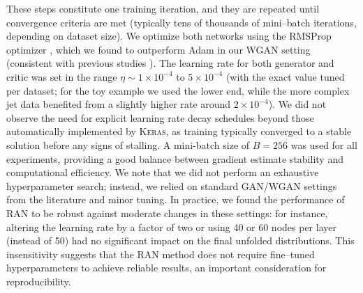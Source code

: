 {{\begin{algorithm}
{          
        }
        \end{algorithm}
        These steps constitute one training iteration, and they are repeated until convergence criteria are met (typically tens of thousands of mini--batch iterations, depending on dataset size).
        We optimize both networks using the RMSProp optimizer , which we found to outperform Adam in our WGAN setting (consistent with previous studies ).
        The learning rate for both generator and critic was set in the range $\eta \sim 1\times10^{-4}$ to $5\times10^{-4}$ (with the exact value tuned per dataset; for the toy example we used the lower end, while the more complex jet data benefited from a slightly higher rate around $2\times10^{-4}$).
        We did not observe the need for explicit learning rate decay schedules beyond those automatically implemented by \textsc{Keras},\kd{} as training typically converged to a stable solution before any signs of stalling.
        A mini-batch size of $B=256$ was used for all experiments, providing a good balance between gradient estimate stability and computational efficiency.
        We note that we did not perform an exhaustive hyperparameter search; instead, we relied on standard GAN/WGAN settings from the literature and minor tuning.
        In practice, we found the performance of RAN to be robust against moderate changes in these settings: for instance, altering the learning rate by a factor of two or using 40 or 60 nodes per layer (instead of 50) had no significant impact on the final unfolded distributions.
        This insensitivity suggests that the RAN method does not require fine--tuned hyperparameters to achieve reliable results, an important consideration for reproducibility.
    
}}
